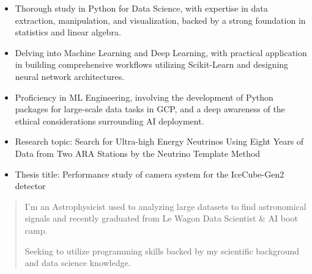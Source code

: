\documentclass[10pt,a4paper,ragged2e,withhyper]{altacv}
\begin{document}
\begin{paracol}{2}
\begin{itemize}
\item Thorough study in Python for Data Science, with expertise in data extraction, manipulation, and visualization, backed by a strong foundation in statistics and linear algebra.
\item Delving into Machine Learning and Deep Learning, with practical application in building comprehensive workflows utilizing Scikit-Learn and designing neural network architectures.
\item Proficiency in ML Engineering, involving the development of Python packages for large-scale data tasks in GCP, and a deep awareness of the ethical considerations surrounding AI deployment.
\end{itemize}
\divider

\begin{itemize}
\item Research topic: Search for Ultra-high Energy Neutrinos Using Eight Years of Data from Two ARA Stations by the Neutrino Template Method
\end{itemize}
\divider

\begin{itemize}
\item Thesis title: Performance study of camera system for the IceCube-Gen2 detector
\end{itemize}
\divider


\switchcolumn


\begin{quote}
I'm an Astrophysicist used to analyzing large datasets to find astronomical signals and recently graduated from Le Wagon Data Scientist \& AI boot camp. 

Seeking to utilize programming skills backed by my scientific background and data science knowledge.
\end{quote}


\\


\end{paracol}
\end{document}
